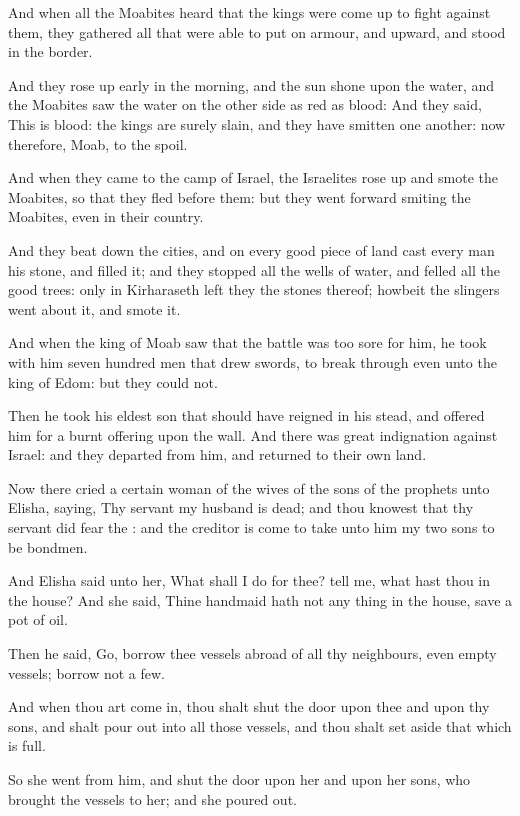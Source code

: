 \Verse And when all the Moabites heard that the kings were come up to fight against them, they gathered all that were able to put on armour, and upward, and stood in the border.

\Verse And they rose up early in the morning, and the sun shone upon the water, and the Moabites saw the water on the other side as red as blood: \Verse And they said, This is blood: the kings are surely slain, and they have smitten one another: now therefore, Moab, to the spoil.

\Verse And when they came to the camp of Israel, the Israelites rose up and smote the Moabites, so that they fled before them: but they went forward smiting the Moabites, even in their country.

\Verse And they beat down the cities, and on every good piece of land cast every man his stone, and filled it; and they stopped all the wells of water, and felled all the good trees: only in Kirharaseth left they the stones thereof; howbeit the slingers went about it, and smote it.

\Verse And when the king of Moab saw that the battle was too sore for him, he took with him seven hundred men that drew swords, to break through even unto the king of Edom: but they could not.

\Verse Then he took his eldest son that should have reigned in his stead, and offered him for a burnt offering upon the wall. And there was great indignation against Israel: and they departed from him, and returned to their own land.


\Chapter
\Verse Now there cried a certain woman of the wives of the sons of the prophets unto Elisha, saying, Thy servant my husband is dead; and thou knowest that thy servant did fear the \LORD: and the creditor is come to take unto him my two sons to be bondmen.

\Verse And Elisha said unto her, What shall I do for thee? tell me, what hast thou in the house? And she said, Thine handmaid hath not any thing in the house, save a pot of oil.

\Verse Then he said, Go, borrow thee vessels abroad of all thy neighbours, even empty vessels; borrow not a few.

\Verse And when thou art come in, thou shalt shut the door upon thee and upon thy sons, and shalt pour out into all those vessels, and thou shalt set aside that which is full.

\Verse So she went from him, and shut the door upon her and upon her sons, who brought the vessels to her; and she poured out.

